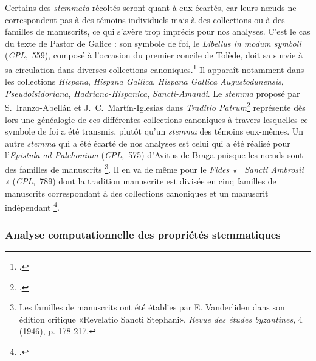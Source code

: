 \documentclass[a4paper,twoside,12pt]{book}
\begin{document}
	
	
Certains des \textit{stemmata} récoltés seront quant à eux écartés, car leurs nœuds ne correspondent pas à des témoins individuels mais à des collections ou à des familles de manuscrits, ce qui s’avère trop imprécis pour nos analyses. C’est le cas du texte de Pastor de Galice : son symbole de foi, le \textit{Libellus in modum symboli} (\textit{CPL},~559), composé à l’occasion du premier concile de Tolède, doit sa survie à sa circulation dans diverses collections canoniques.\footcite[Pour une vue chronologique et systématique des collections canoniques, voir][]{kery, Hispana}
 Il apparaît notamment dans les collections \textit{Hispana}, \textit{Hispana Gallica}, \textit{Hispana Gallica Augustodunensis}, \textit{Pseudoisidoriana}, \textit{Hadriano-Hispanica}, \textit{Sancti-Amandi}. Le \textit{stemma} proposé par S.~Iranzo-Abellán et J.~C.~Martín-Iglesias dans \textit{Traditio Patrum}\footcite[p. 349]{TradPat} représente dès lors une généalogie de ces différentes collections canoniques à travers lesquelles ce symbole de foi a été transmis, plutôt qu’un \textit{stemma} des témoins eux-mêmes.
	Un autre \textit{stemma} qui a été écarté de nos analyses est celui qui a été réalisé pour l'\textit{Epistula ad Palchonium}  (\textit{CPL},~575) d'Avitus de Braga puisque les nœuds sont  des familles de manuscrits \footnote{Les familles de manuscrits ont été établies par E. Vanderliden dans son édition critique «Revelatio Sancti Stephani», \textit{Revue des études byzantines}, 4 (1946), p. 178-217.}. Il en va de même pour le \textit{Fides « ~Sancti Ambrosii~ »}  (\textit{CPL},~789) dont la tradition manuscrite est divisée en cinq familles de manuscrits correspondant à des collections canoniques et un manuscrit indépendant \footcite [p. 237-242]{TradPat}. 
	
\subsubsection{Analyse computationnelle des propriétés stemmatiques}
\end{document}
